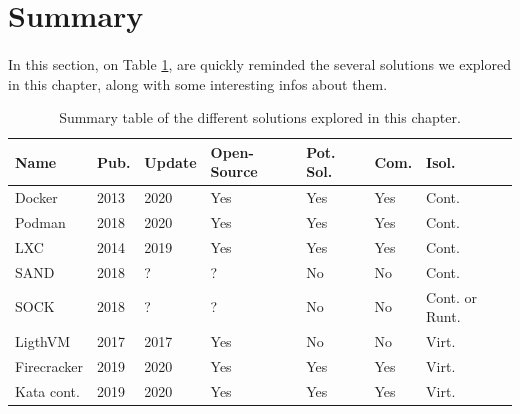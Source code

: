 \section{Summary}
\paragraph{}In this section, on Table \ref{tab:summary}, are quickly reminded the several solutions we explored in this chapter, along with some interesting infos about them.
\begin{table}[!h]

  \begin{center}
    \begin{tabular}{|p{}|p{}|p{}|p{}|p{}|p{}|p{}|}
       \hline
       \textbf{Name} & \textbf{Pub.} & \textbf{Update} & \textbf{Open-Source} & \textbf{Pot. Sol.} & \textbf{Com.} & \textbf{Isol.} \\
       \hline
       Docker & 2013 & 2020 & Yes & Yes & Yes & Cont. \\
       \hline
       Podman & 2018 & 2020 & Yes & Yes & Yes & Cont. \\
       \hline
       LXC & 2014 & 2019 & Yes & Yes & Yes & Cont. \\
       \hline
       SAND & 2018 & ? & ? & No & No & Cont. \\
       \hline
       SOCK & 2018 & ? & ? & No & No & Cont. or Runt. \\
       \hline
       LigthVM & 2017 & 2017 & Yes & No & No & Virt. \\
       \hline
       Firecracker & 2019 & 2020 & Yes & Yes & Yes & Virt.\\
       \hline
       Kata cont. & 2019 & 2020 & Yes & Yes & Yes & Virt. \\
       \hline
    \end{tabular}
  \end{center}
  \caption{Summary table of the different solutions explored in this chapter.}
  \label{tab:summary}
\end{table}
